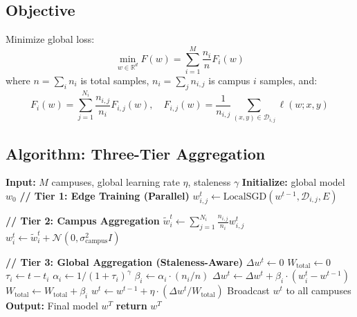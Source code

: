\documentclass[conference]{IEEEtran}
\newcommand{\RETURN}{\STATE \textbf{return} }
\begin{document}

\subsection{Objective}

Minimize global loss:
\begin{equation}
\min_{w \in \mathbb{R}^d} F(w) = \sum_{i=1}^{M} \frac{n_i}{n} F_i(w)
\end{equation}
where $n = \sum_i n_i$ is total samples, $n_i = \sum_j n_{i,j}$ is campus $i$ samples, and:
\begin{equation}
F_i(w) = \sum_{j=1}^{N_i} \frac{n_{i,j}}{n_i} F_{i,j}(w), \quad F_{i,j}(w) = \frac{1}{n_{i,j}} \sum_{(x,y) \in \mathcal{D}_{i,j}} \ell(w; x, y)
\end{equation}

\subsection{Algorithm: Three-Tier Aggregation}

\begin{algorithm}[H]
\caption{Hierarchical FedAvg (H-FedAvg)}
\begin{algorithmic}[1]
\STATE \textbf{Input:} $M$ campuses, global learning rate $\eta$, staleness $\gamma$
\STATE \textbf{Initialize:} global model $w_0$
    \STATE \textbf{// Tier 1: Edge Training (Parallel)}
            \STATE $w_{i,j}^{t} \leftarrow \text{LocalSGD}(w^{t-1}, \mathcal{D}_{i,j}, E)$ 
        \ENDFOR
    \ENDFOR
    
    \STATE \textbf{// Tier 2: Campus Aggregation}
        \STATE $\tilde{w}_i^t \leftarrow \sum_{j=1}^{N_i} \frac{n_{i,j}}{n_i} w_{i,j}^t$ 
        \STATE $w_i^t \leftarrow \tilde{w}_i^t + \mathcal{N}(0, \sigma_{\text{campus}}^2 I)$ 
    \ENDFOR
    
    \STATE \textbf{// Tier 3: Global Aggregation (Staleness-Aware)}
    \STATE $\Delta w^t \leftarrow 0$
    \STATE $W_{\text{total}} \leftarrow 0$
        \STATE $\tau_i \leftarrow t - t_i$ 
        \STATE $\alpha_i \leftarrow 1 / (1 + \tau_i)^\gamma$ 
        \STATE $\beta_i \leftarrow \alpha_i \cdot (n_i / n)$ 
        \STATE $\Delta w^t \leftarrow \Delta w^t + \beta_i \cdot (w_i^t - w^{t-1})$
        \STATE $W_{\text{total}} \leftarrow W_{\text{total}} + \beta_i$
    \ENDFOR
    \STATE $w^t \leftarrow w^{t-1} + \eta \cdot (\Delta w^t / W_{\text{total}})$
    \STATE Broadcast $w^t$ to all campuses
\ENDFOR
\STATE \textbf{Output:} Final model $w^T$
\RETURN $w^T$
\end{algorithmic}
\end{algorithm}
\end{document}
